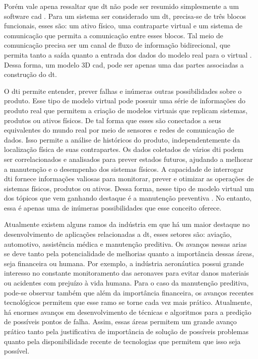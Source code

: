   

Porém vale apena ressaltar que \acrshort{dt} não pode ser resumido simplesmente a um software \acrshort{cad} \cite{Barricelli2019}.  Para um sistema ser considerado um \acrshort{dt}, precisa-se de três blocos funcionais, esses são: um ativo físico, uma contraparte virtual e um sistema de comunicação que permita a comunicação entre esses blocos. Tal meio de comunicação precisa ser um canal de fluxo de informação bidirecional, que permita tanto a saída quanto a entrada dos dados do modelo real para o virtual \cite{Mihai2022}. Dessa forma, um modelo 3D \acrshort{cad}, pode ser apenas uma das partes associadas a construção do \acrlong{dt}. 

  

  

O \acrlong{dti} permite entender, prever falhas e inúmeras outras possibilidades sobre o produto. Esse tipo de modelo virtual pode possuir uma série de informações do produto real que permitem a criação de modelos virtuais que replicam sistemas, produtos ou ativos físicos. De tal forma que esses são conectados a seus equivalentes do mundo real por meio de sensores e redes de comunicação de dados. Isso permite a análise de históricos do produto, independentemente da localização física de suas contrapartes. Os dados coletados de vários \acrshort{dti} podem ser correlacionados e analisados para prever estados futuros, ajudando a melhorar a manutenção e o desempenho dos sistemas físicos. A capacidade de interrogar \acrshort{dti} fornece informações valiosas para monitorar, prever e otimizar as operações de sistemas físicos, produtos ou ativos. Dessa forma, nesse tipo de modelo virtual um dos tópicos que vem ganhando destaque é a manutenção preventiva \cite{Grieves2017}. No entanto, essa é apenas uma de inúmeras possibilidades que esse conceito oferece. 

  

Atualmente existem alguns ramos da indústria em que há um maior destaque no desenvolvimento de aplicações relacionadas a \acrshort{dt}, esses setores são: aviação, automotivo, assistência médica e manutenção preditiva. Os avanços nessas arias se deve tanto pela potencialidade de melhorias quanto a importância dessas áreas, seja financeira ou humana. Por exemplo, a indústria aeronáutica possui grande interesso no constante monitoramento das aeronaves para evitar danos materiais ou acidentes com prejuízo à vida humana. Para o caso da manutenção preditiva, pode-se observar também que além da importância financeira, os avanços recentes tecnológicos permitem que esse ramo se torne cada vez mais prático. Atualmente, há enormes avanços em desenvolvimento de técnicas e algoritmos para a predição de possíveis pontos de falha. Assim, essas áreas permitem um grande avanço prático tanto pela justificativa de importância de solução de possíveis problemas quanto pela disponibilidade recente de tecnologias que permitem que isso seja possível.  


